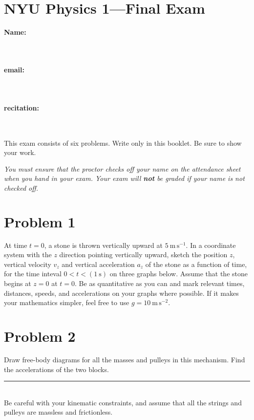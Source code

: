 \documentclass[12pt]{article}
\begin{document}
\section*{NYU Physics 1---Final Exam}

\vfill

\paragraph{Name:} ~

\paragraph{email:} ~

\paragraph{recitation:} ~

\vfill

This exam consists of six problems.  Write only in this booklet.  Be
sure to show your work.

\vfill

\emph{You must ensure that the proctor checks off your name on the
attendance sheet when you hand in your exam.  Your exam will
\textbf{not} be graded if your name is not checked off.}

\clearpage

\section*{Problem 1}

At time $t=0$, a stone is thrown vertically upward at
$5~\mathrm{m\,s^{-1}}$.  In a coordinate system with the $z$ direction
pointing vertically upward, sketch the position $z$, vertical velocity
$v_z$ and vertical acceleration $a_z$ of the stone as a function of
time, for the time inteval $0<t<(1~\mathrm{s})$ on three graphs below.
Assume that the stone begins at $z=0$ at $t=0$.  Be as quantitative as
you can and mark relevant times, distances, speeds, and accelerations
on your graphs where possible.  If it makes your mathematics simpler,
feel free to use $g= 10~\mathrm{m\,s^{-2}}$.

\clearpage

\section*{Problem 2}

Draw free-body diagrams for all the masses and pulleys in this
mechanism.  Find the accelerations of the two blocks.\\
\rule{0.35\textwidth}{0pt}
\\ Be careful with your kinematic constraints, and assume that all the
strings and pulleys are massless and frictionless.
\end{document}
